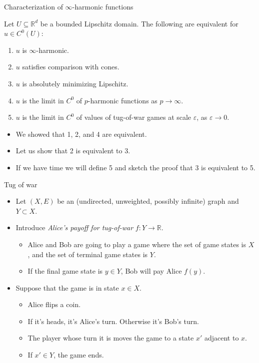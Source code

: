 \documentclass[10pt]{beamer}
\newcommand{\RR}{\mathbb{R}}
\begin{document}
\begin{frame}{Characterization of $\infty$-harmonic functions}
\begin{theorem}
Let $U \subseteq \RR^d$ be a bounded Lipschitz domain.
The following are equivalent for $u \in C^0(U)$: 
\begin{enumerate}
\item $u$ is $\infty$-harmonic. 
\item $u$ satisfies comparison with cones. 
\item $u$ is absolutely minimizing Lipschitz. 
\item $u$ is the limit in $C^0$ of $p$-harmonic functions as $p \to \infty$. 
\item $u$ is the limit in $C^0$ of values of tug-of-war games at scale $\varepsilon$, as $\varepsilon \to 0$. 
\end{enumerate}
\end{theorem}
    
\begin{itemize}
    \item We showed that 1, 2, and 4 are equivalent. 
    \item Let us show that 2 is equivalent to 3. 
    \item If we have time we will define 5 and sketch the proof that 3 is equivalent to 5.
\end{itemize}
\end{frame}

\begin{frame}{Tug of war}
\begin{itemize}
\item Let $(X, E)$ be an (undirected, unweighted, possibly infinite) graph and $Y \subset X$. 
\item Introduce \emph{Alice's payoff for tug-of-war} $f: Y \to \RR$.  
\begin{itemize}
\item Alice and Bob are going to play a game where the set of game states is $X$, and the set of terminal game states is $Y$.
\item If the final game state is $y \in Y$, Bob will pay Alice $f(y)$.  
\end{itemize}
\item Suppose that the game is in state $x \in X$.  
\begin{itemize}
\item Alice flips a coin.
\item If it's heads, it's Alice's turn. Otherwise it's Bob's turn.
\item The player whose turn it is moves the game to a state $x'$ adjacent to $x$.
\item If $x' \in Y$, the game ends.
\end{itemize}
\end{itemize}
\end{frame}
\end{document}
